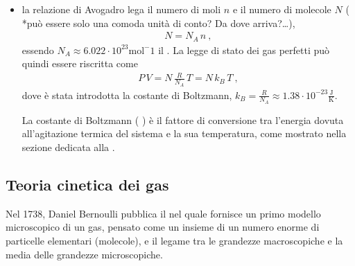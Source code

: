 \documentclass[letterpaper,10pt,italian]{jupyterBook}
\begin{document}
\begin{itemize}
\item {} 
\sphinxAtStartPar
la relazione di Avogadro lega il numero di moli \(n\) e il numero di molecole \(N\) ( *può essere solo una comoda unità di conto? Da dove arriva?…),
\begin{equation*}
\begin{split}N = N_A \, n \ ,\end{split}
\end{equation*}
\sphinxAtStartPar
essendo \(N_A \approx 6.022 \cdot 10^{23} \text{mol}^-1\) il . La legge di stato dei gas perfetti può quindi essere riscritta come
\begin{equation*}
\begin{split}P \, V = N \, \frac{R}{N_A} \, T = N \, k_B \, T \ , \end{split}
\end{equation*}
\sphinxAtStartPar
dove è stata introdotta la costante di Boltzmann, \(k_B = \frac{R}{N_A} \approx 1.38 \cdot 10^{-23} \frac{\text{J}}{\text{K}}\).

\sphinxAtStartPar
La costante di Boltzmann ( ) è il fattore di conversione tra l’energia dovuta all’agitazione termica del sistema e la sua temperatura, come mostrato nella sezione dedicata alla {\hyperref[\detokenize{ch/thermodynamics/ideal-gas-kinetic-theory:physics-hs-thermodynamics-matter-gases-ideal-kinetic-theory}]{}}.

\end{itemize}

\sphinxstepscope


\subsection{Teoria cinetica dei gas}
\label{\detokenize{ch/thermodynamics/ideal-gas-kinetic-theory:teoria-cinetica-dei-gas}}\label{\detokenize{ch/thermodynamics/ideal-gas-kinetic-theory:physics-hs-thermodynamics-matter-gases-ideal-kinetic-theory}}\label{\detokenize{ch/thermodynamics/ideal-gas-kinetic-theory::doc}}
\sphinxAtStartPar
Nel 1738, Daniel Bernoulli pubblica il  nel quale fornisce un primo modello microscopico di un gas, pensato come un insieme di un numero enorme  di particelle elementari (molecole), e il legame tra le grandezze macroscopiche e la media delle grandezze microscopiche.
\end{document}
